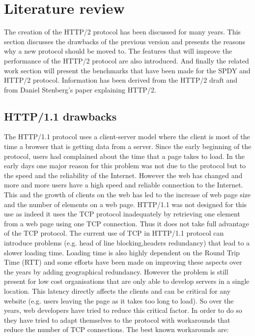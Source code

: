 \section{Literature review}
\label{relwork}
The creation of the HTTP/2 protocol has been discussed for many years. This section discusses the drawbacks of the previous version and presents the reasons why a new protocol should be moved to. The features that will improve the performance of the HTTP/2 protocol are also introduced. And finally the related work section will present the benchmarks that have been made for the SPDY and HTTP/2 protocol. Information has been derived from the HTTP/2 draft\cite{http2} and from Daniel Stenberg's paper explaining HTTP/2\cite{stenberg}. 

\subsection{HTTP/1.1 drawbacks}
The HTTP/1.1 protocol uses a client-server model where the client is most of the time a browser that is getting data from a server. Since the early beginning of the protocol, users had complained about the time that a page takes to load. In the early days one major reason for this problem was not due to the protocol but to the speed and the reliability of the Internet. However the web has changed and more and more users have a high speed and reliable connection to the Internet. This and the growth of clients on the web has led to the increase of web page size and the number of elements on a web page. HTTP/1.1 was not designed for this use as indeed it uses the TCP protocol inadequately by retrieving one element from a web page using one TCP connection. Thus it does not take full advantage of the TCP protocol. The current use of TCP in HTTP/1.1 protocol can introduce problems (e.g. head of line blocking,headers redundancy) that lead to a slower loading time. Loading time is also highly dependent on the Round Trip Time (RTT) and some efforts have been made on improving these aspects over the years by adding geographical redundancy. However the problem is still present for low cost organisations that are only able to develop servers in a single location. 
This latency directly affects the clients and can be critical for any website (e.g. users leaving the page as it takes too long to load). So over the years, web developers have tried to reduce this critical factor. In order to do so they have tried to adapt themselves to the protocol with workarounds that reduce the number of TCP connections. The best known workarounds are:
